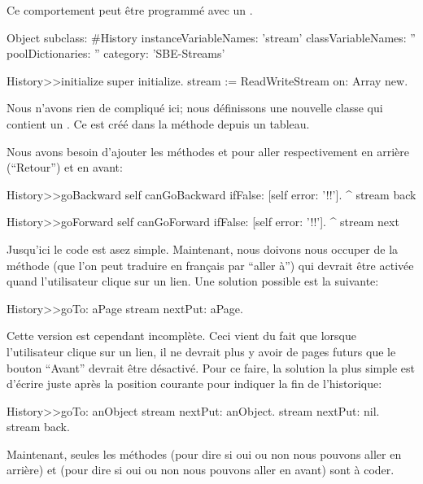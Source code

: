 \documentclass[a4paper,10pt,twoside]{book}
\begin{document}
Ce comportement peut \^etre programm\'e avec un .

\begin{code}{}
Object subclass: #History
  instanceVariableNames: 'stream'
  classVariableNames: ''
  poolDictionaries: ''
  category: 'SBE-Streams'

History>>initialize
    super initialize.
    stream := ReadWriteStream on: Array new.
\end{code}

Nous n'avons rien de compliqu\'e ici; nous d\'efinissons une nouvelle classe
qui contient un \stream. Ce \stream est cr\'eé dans la m\'ethode  
depuis un tableau.

Nous avons besoin d'ajouter les m\'ethodes  et  pour aller respectivement en arri\`ere (``Retour'') et en avant:

\begin{code}{}
History>>goBackward
  self canGoBackward ifFalse: [self error: '!!'].
  ^ stream back

History>>goForward
  self canGoForward ifFalse: [self error: '!!'].
  ^ stream next
\end{code}

Jusqu'ici le code est asez simple. Maintenant, nous doivons nous occuper
de la m\'ethode  (que l'on peut traduire en fran\c{c}ais par ``aller \`a'') qui devrait \^etre activ\'ee quand l'utilisateur
clique sur un lien. Une solution possible est la suivante:

\begin{code}{}
History>>goTo: aPage
    stream nextPut: aPage.
\end{code}

Cette version est cependant incompl\`ete. Ceci vient du fait que lorsque l'utilisateur clique sur un lien, il ne devrait plus y avoir de pages futurs \ie
que le bouton ``Avant'' devrait \^etre d\'esactiv\'e.
Pour ce faire, la solution la plus simple est d'\'ecrire 
juste apr\`es la position courante pour indiquer la fin de l'historique:

\begin{code}{}
History>>goTo: anObject
  stream nextPut: anObject.
  stream nextPut: nil.
  stream back.
\end{code}

Maintenant, seules les m\'ethodes  (pour dire si oui ou non nous pouvons aller en arri\`ere) et  (pour dire si oui ou non nous pouvons aller en avant) sont \`a coder.
\end{document}
